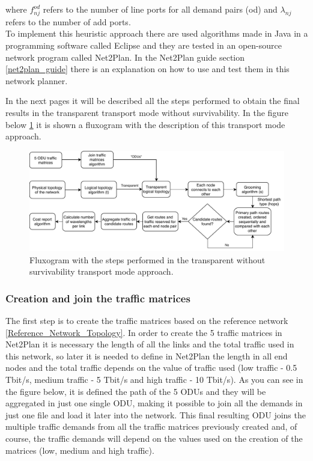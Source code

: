 \noindent
where $f_{nj}^{od}$ refers to the number of line ports for all demand pairs (od) and $\lambda_{nj}$ refers to the number of add ports.\\

\vspace{11pt}
To implement this heuristic approach there are used algorithms made in Java in a programming software called Eclipse and they are tested in an open-source network program called Net2Plan. In the Net2Plan guide section \ref{net2plan_guide} there is an explanation on how to use and test them in this network planner.

In the next pages it will be described all the steps performed to obtain the final results in the transparent transport mode without survivability. In the figure below \ref{fluxogram_transp_surv} it is shown a fluxogram with the description of this transport mode approach.

\begin{figure}[H]
\centering
\includegraphics[width=16cm]{sdf/heuristic/transparent_survivability/figures/fluxogram_transparent_surv}
\caption{Fluxogram with the steps performed in the transparent without survivability transport mode approach.}
\label{fluxogram_transp_surv}
\end{figure}

\newpage
\subsubsection{Creation and join the traffic matrices}

\noindent
The first step is to create the traffic matrices based on the reference network \ref{Reference_Network_Topology}. In order to create the 5 traffic matrices in Net2Plan it is necessary the length of all the links and the total traffic used in this network, so later it is needed to define in Net2Plan the length in all end nodes and the total traffic depends on the value of traffic used (low traffic - 0.5 Tbit/s, medium traffic - 5 Tbit/s and high traffic - 10 Tbit/s). As you can see in the figure below, it is defined the path of the 5 ODUs and they will be aggregated in just one single ODU, making it possible to join all the demands in just one file and load it later into the network. This final resulting ODU joins the multiple traffic demands from all the traffic matrices previously created and, of course, the traffic demands will depend on the values used on the creation of the matrices (low, medium and high traffic).

